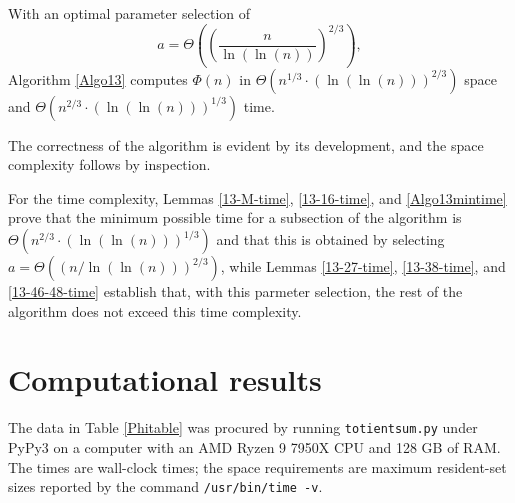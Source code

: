 \documentclass[12pt]{article}
\makeatletter
\newcommand{\eqn}[1]{\begin{displaymath} #1 \end{displaymath}}
\renewenvironment{proof}[1][\proofname]{\par
  \vspace{-\topsep}%
  \pushQED{\qed}%
  \normalfont
  \topsep0pt \partopsep0pt %
  \trivlist
  \item[\hskip\labelsep
        \itshape
    #1\@addpunct{.}]\ignorespaces
}{%
  \popQED\endtrivlist\@endpefalse
  \addvspace{0pt} %
}
\makeatother
\begin{document}
\begin{theorem} \label{Algo13time}
With an optimal parameter selection of
\eqn{a = \Theta\left(\left( \frac{n}{\ln(\ln(n))} \right)^{2/3} \right),}
Algorithm \ref{Algo13} computes $\Phi(n)$ in $\Theta\left(n^{1/3} \cdot (\ln(\ln(n)))^{2/3}\right)$ space and $\Theta\left( n^{2/3} \cdot (\ln(\ln(n)))^{1/3} \right)$ time.
\end{theorem}
\begin{proof}
The correctness of the algorithm is evident by its development, and the space complexity follows by inspection.

For the time complexity, Lemmas \ref{13-M-time}, \ref{13-16-time}, and \ref{Algo13mintime} prove that the minimum possible time for a subsection of the algorithm is $\Theta\left( n^{2/3} \cdot (\ln(\ln(n)))^{1/3} \right)$ and that this is obtained by selecting $a = \Theta\left((n/\ln(\ln(n)))^{2/3}\right)$, while Lemmas \ref{13-27-time}, \ref{13-38-time}, and \ref{13-46-48-time} establish that, with this parmeter selection, the rest of the algorithm does not exceed this time complexity.
\end{proof}

\section{Computational results} \label{ComputationalResults}

The data in Table \ref{Phitable} was procured by running \texttt{totientsum.py} under PyPy3 on a computer with an AMD Ryzen 9 7950X CPU and 128 GB of RAM.  The times are wall-clock times; the space requirements are maximum resident-set sizes reported by the command \texttt{/usr/bin/time -v}.
\end{document}
